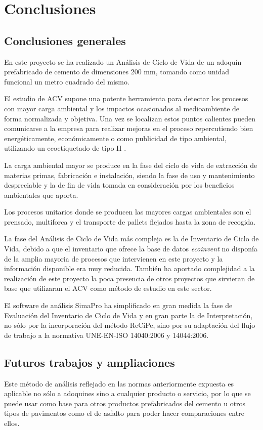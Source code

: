 \chapter{Conclusiones}\label{cap:conclusiones}
\section{Conclusiones generales}
En este proyecto se ha realizado un Análisis de Ciclo de Vida de un adoquín prefabricado de cemento de dimensiones 200 \si{mm}, tomando como unidad funcional un metro cuadrado del mismo.

El estudio de ACV supone una potente herramienta para detectar los procesos con mayor carga ambiental y los impactos ocasionados al medioambiente de forma normalizada y objetiva. Una vez se localizan estos puntos calientes pueden comunicarse a la empresa para realizar mejoras en el proceso repercutiendo bien energéticamente, económicamente o como publicidad de tipo ambiental, utilizando un ecoetiquetado de tipo II \cite{iso14021}.

La carga ambiental mayor se produce en la fase del ciclo de vida de extracción de materias primas, fabricación e instalación, siendo la fase de uso y mantenimiento despreciable y la de fin de vida tomada en consideración por los beneficios ambientales que aporta.

Los procesos unitarios donde se producen las mayores cargas ambientales son el prensado, multiforca y el transporte de pallets flejados hasta la zona de recogida.

La fase del Análisis de Ciclo de Vida más compleja es la de Inventario de Ciclo de Vida, debido a que el inventario que ofrece la base de datos \textit{ecoinvent} no disponía de la amplia mayoria de procesos que intervienen en este proyecto y la información disponible era muy reducida. También ha aportado complejidad a la realización de este proyecto la poca presencia de otros proyectos que sirvieran de base que utilizaran el ACV como método de estudio en este sector.

El software de análisis SimaPro ha simplificado en gran medida la fase de Evaluación del Inventario de Ciclo de Vida y en gran parte la de Interpretación, no sólo por la incorporación del método ReCiPe, sino por su adaptación del flujo de trabajo a la normativa UNE-EN-ISO 14040:2006 y 14044:2006.


\section{Futuros trabajos y ampliaciones}

Este método de análisis reflejado en las normas anteriormente expuesta es aplicable no sólo a adoquines sino a cualquier producto o servicio, por lo que se puede usar como base para otros productos prefabricados del cemento u otros tipos de pavimentos como el de asfalto para poder hacer comparaciones entre ellos.

